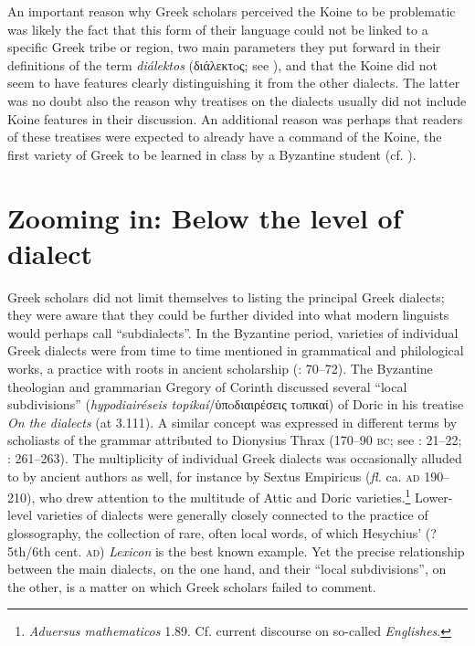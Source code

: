 An important reason why Greek scholars perceived the Koine to be problematic was likely the fact that this form of their language could not be linked to a specific Greek tribe or region, two main parameters they put forward in their definitions of the term \textit{diálektos} (διάλεκτoς; see \citealt{VanRooy2016d}), and that the Koine did not seem to have features clearly distinguishing it from the other dialects. The latter was no doubt also the reason why treatises on the dialects usually did not include Koine features in their discussion. An additional reason was perhaps that readers of these treatises were expected to already have a command of the Koine, the first variety of Greek to be learned in class by a Byzantine student (cf. \citealt{VanRooy2016b}).

\section{Zooming in: Below the level of dialect}\label{sec:2.4}

Greek scholars did not limit themselves to listing the principal Greek dialects; they were aware that they could be further divided into what modern linguists would perhaps call “subdialects”. In the Byzantine period, varieties of individual Greek dialects were from time to time mentioned in grammatical and philological works, a practice with roots in ancient scholarship (\citealt{Hainsworth1967}: 70–72). The Byzantine theologian and grammarian Gregory of Corinth discussed several “local subdivisions” (\textit{hypodiairéseis topikaí}/ὑπoδιαιρέσεις τoπικαί) of Doric in his treatise \textit{On the dialects} (at 3.111). A similar concept was expressed in different terms by scholiasts of the grammar attributed to Dionysius Thrax (170–90 \textsc{bc}; see \citealt{Lambert2009}: 21–22; \citealt{VanRooy2016d}: 261–263). The multiplicity of individual Greek dialects was occasionally alluded to by ancient authors as well, for instance by Sextus Empiricus (\textit{fl.} ca. \textsc{ad} 190–210), who drew attention to the multitude of Attic and Doric varieties.\footnote{\textit{Aduersus mathematicos} 1.89. Cf. current discourse on so-called \textit{Englishes}.} Lower-level varieties of dialects were generally closely connected to the practice of glossography, the collection of rare, often local words, of which Hesychius’ (?5th/6th cent. \textsc{ad}) \textit{Lexicon} is the best known example. Yet the precise relationship between the main dialects, on the one hand, and their “local subdivisions”, on the other, is a matter on which Greek scholars failed to comment.

